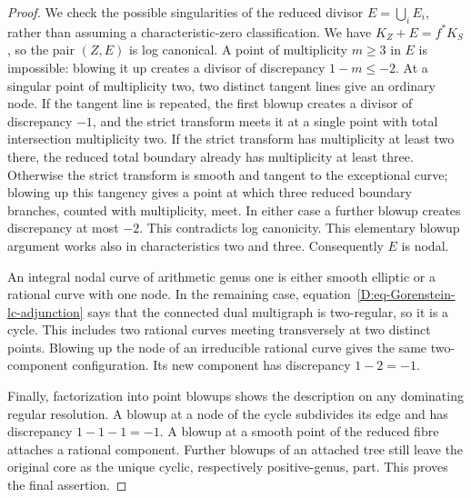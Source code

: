 \begin{proof}
We check the possible singularities of the reduced divisor
$E=\bigcup_i E_i$, rather than assuming a characteristic-zero
classification.  We have $K_Z+E=f^*K_S$, so the pair $(Z,E)$ is
log canonical.  A point of multiplicity $m\geq3$ in $E$ is
impossible: blowing it up creates a divisor of discrepancy
$1-m\leq-2$.  At a singular point of multiplicity two, two
distinct tangent lines give an ordinary node.  If the tangent line
is repeated, the first blowup creates a divisor of discrepancy
$-1$, and the strict transform meets it at a single point with
total intersection multiplicity two.  If the strict transform
has multiplicity at least two there, the reduced total boundary
already has multiplicity at least three.  Otherwise the strict
transform is smooth and tangent to the exceptional curve;
blowing up this tangency gives a point at which three reduced
boundary branches, counted with multiplicity, meet.  In either
case a further blowup creates discrepancy at most $-2$.
This contradicts log canonicity.  This elementary blowup argument
works also in characteristics two and three.
Consequently $E$ is nodal.

An integral nodal curve of arithmetic genus one is either smooth
elliptic or a rational curve with one node.  In the remaining case,
equation~\eqref{D:eq-Gorenstein-lc-adjunction} says that the connected
dual multigraph is two-regular, so it is a cycle.  This includes
two rational curves meeting transversely at two distinct points.
Blowing up the node of an irreducible rational curve gives the
same two-component configuration.  Its new component has
discrepancy $1-2=-1$.

Finally, factorization into point blowups shows the description
on any dominating regular resolution.  A blowup at a node of the
cycle subdivides its edge and has discrepancy $1-1-1=-1$.
A blowup at a smooth point of the reduced fibre attaches a
rational component.  Further blowups of an attached tree still
leave the original core as the unique cyclic, respectively
positive-genus, part.  This proves the final assertion.
\end{proof}

